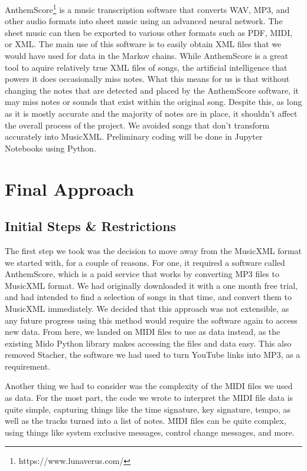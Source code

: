\documentclass{article}
\begin{document}
AnthemScore\footnote{https://www.lunaverus.com/} is a music transcription software that converts WAV, MP3, and other audio formats into sheet music using an advanced 
neural network. The sheet music can then be exported to various other formats such as PDF, MIDI, or XML. The main use of this software is to easily obtain XML files that 
we would have used for data in the Markov chains. While AnthemScore is a great tool to aquire relatively true XML files of songs, the artificial intelligence that 
powers it does occasionally miss notes. What this means for us is that without changing the notes that are detected and placed by the AnthemScore software, it may miss notes 
or sounds that exist within the original song. Despite this, as long as it is mostly accurate and the majority of notes are in place, it shouldn't affect the overall process 
of the project. We avoided songs that don't transform accurately into MusicXML. Preliminary coding will be done in Jupyter Notebooks using Python. 


\section{Final Approach}
\subsection{Initial Steps \& Restrictions}
The first step we took was the decision to move away from the MusicXML format we started with, for a couple of reasons. For one, it required a software called AnthemScore, 
which is a paid service that works by converting MP3 files to MusicXML format. We had originally downloaded it with a one month free trial, and had intended to find a 
selection of songs in that time, and convert them to MusicXML immediately. We decided that this approach was not extensible, as any future progress using this method would 
require the software again to access new data. From here, we landed on MIDI files to use as data instead, as the existing Mido Python library makes accessing the files and 
data easy. This also removed Stacher, the software we had used to turn YouTube links into MP3, as a requirement.

Another thing we had to consider was the complexity of the MIDI files we used as data. For the most part, the code we wrote to interpret the MIDI file data is quite simple, 
capturing things like the time signature, key signature, tempo, as well as the tracks turned into a list of notes. MIDI files can be quite complex, using things like 
system exclusive messages, control change messages, and more. 
\end{document}
